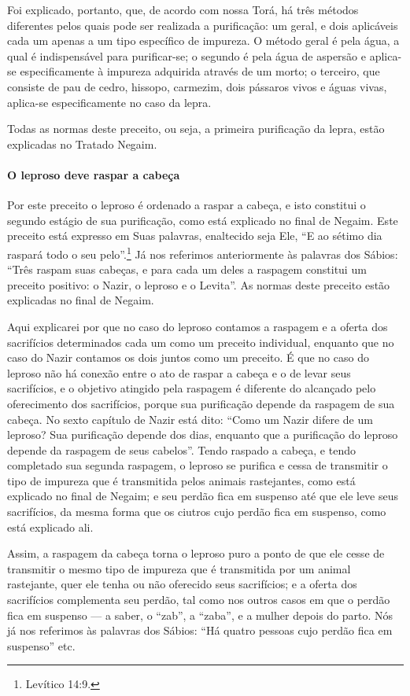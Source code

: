 Foi explicado, portanto, que, de acordo com nossa Torá, há três
métodos diferentes pelos quais pode ser realizada a purificação: um
geral, e dois aplicáveis cada um apenas a um tipo específico de
impureza. O método geral é pela água, a qual é indispensável para
purificar-se; o segundo é pela água de aspersão e aplica-se
especificamente à impureza adquirida através de um morto; o terceiro,
que consiste de pau de cedro, hissopo, carmezim, dois pássaros vivos e
águas vivas, aplica-se especificamente no caso da lepra.

Todas as normas deste preceito, ou seja, a primeira purificação da
lepra, estão explicadas no Tratado Negaim.

\paragraph{O leproso deve raspar a cabeça}

Por este preceito o leproso é ordenado a raspar a cabeça, e isto
constitui o segundo estágio de sua purificação, como está explicado no
final de Negaim. Este preceito está expresso em Suas palavras,
enaltecido seja Ele, ``E ao sétimo dia raspará todo o seu pelo''.\footnote{Levítico 14:9.} Já nos referimos anteriormente às palavras dos Sábios:
``Três raspam suas cabeças, e para cada um deles
a raspagem constitui um preceito positivo: o Nazir, o leproso e o
Levita''. As normas deste preceito estão explicadas no final de Negaim.

Aqui explicarei por que no caso do leproso contamos a raspagem e a
oferta dos sacrifícios determinados cada um como um preceito individual,
enquanto que no caso do Nazir contamos os dois juntos como um preceito.
É que no caso do leproso não há conexão entre o ato de raspar a cabeça e
o de levar seus sacrifícios, e o objetivo atingido pela raspagem é
diferente do alcançado pelo oferecimento dos sacrifícios, porque sua
purificação depende da raspagem de sua cabeça. No sexto capítulo de
Nazir está dito: ``Como um Nazir difere de um leproso? Sua purificação
depende dos dias, enquanto que a purificação do leproso depende da
raspagem de seus cabelos''. Tendo raspado a cabeça, e tendo completado
sua segunda raspagem, o leproso se purifica e cessa de transmitir o tipo
de impureza que é transmitida pelos animais rastejantes, como está
explicado no final de Negaim; e seu perdão fica em suspenso até que ele
leve seus sacrifícios, da mesma forma que os ciutros cujo perdão fica em
suspenso, como está explicado ali.

Assim, a raspagem da cabeça torna o leproso puro a ponto de que ele
cesse de transmitir o mesmo tipo de impureza que é transmitida por um
animal rastejante, quer ele tenha ou não oferecido seus sacrifícios; e a
oferta dos sacrifícios complementa seu perdão, tal como nos outros casos
em que o perdão fica em suspenso --- a saber, o ``zab'', a ``zaba'', e a
mulher depois do parto. Nós já nos referimos às palavras dos Sábios:
``Há quatro pessoas cujo perdão fica em suspenso'' etc.

